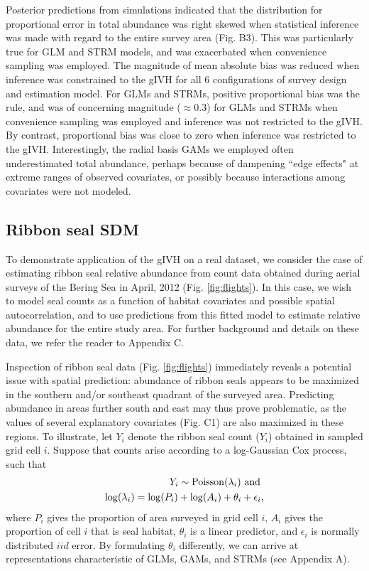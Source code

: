 \documentclass[12pt,english]{article}
\begin{document}
\begin{spacing}{1.9}
Posterior predictions from simulations indicated that the distribution for proportional error in total abundance was right skewed when statistical inference was made with regard to the entire survey area (Fig. B3).  This was particularly true for GLM and STRM models, and was exacerbated when convenience sampling was employed.  The magnitude of mean absolute bias was reduced when inference was constrained to the gIVH for all 6 configurations of survey design and estimation model.  For GLMs and STRMs, positive proportional bias was the rule, and was of concerning magnitude ($\approx 0.3$) for GLMs and STRMs when convenience sampling was employed and inference was not restricted to the gIVH.  By contrast, proportional bias was close to zero when inference was restricted to the gIVH.  Interestingly, the radial basis GAMs we employed often underestimated total abundance, perhaps because of dampening ``edge effects" at extreme ranges of observed covariates, or possibly because interactions among covariates were not modeled.


\subsection{Ribbon seal SDM}

To demonstrate application of the gIVH on a real dataset, we consider the case of estimating ribbon seal relative abundance from count data obtained during aerial surveys of the Bering Sea in April, 2012 (Fig. \ref{fig:flights}).  In this case, we wish to model seal counts as a function of habitat covariates and possible spatial autocorrelation, and to use predictions from this fitted model to estimate relative abundance for the entire study area.  For further background and details on these data, we refer the reader to Appendix C.

Inspection of ribbon seal data (Fig. \ref{fig:flights}) immediately reveals a potential
issue with spatial prediction: abundance of ribbon seals appears to be maximized in the southern and/or southeast quadrant of the surveyed area.  Predicting abundance in areas further south and east may thus prove problematic, as the values of several explanatory covariates (Fig. C1) are also maximized in these regions.  To illustrate, let $Y_i$ denote the ribbon seal count ($Y_i$) obtained in sampled grid cell $i$.  Suppose that counts arise according to a log-Gaussian Cox process, such that
\begin{eqnarray}
  \label{eqn:Cox}
  Y_i \sim {\rm Poisson}(\lambda_i) \mbox{ and } \\
  \log(\lambda_i) = \log(P_i) + \log(A_i) + \theta_i + \epsilon_i, \nonumber
\end{eqnarray}
where $P_i$ gives the proportion of area surveyed in grid cell $i$, $A_i$ gives the proportion of cell $i$ that is seal habitat, $\theta_i$ is a linear predictor, and $\epsilon_i$ is normally distributed $iid$ error.  By formulating $\theta_i$ differently, we can arrive at representations characteristic of GLMs, GAMs, and STRMs (see Appendix A).


\end{spacing}
\end{document}
